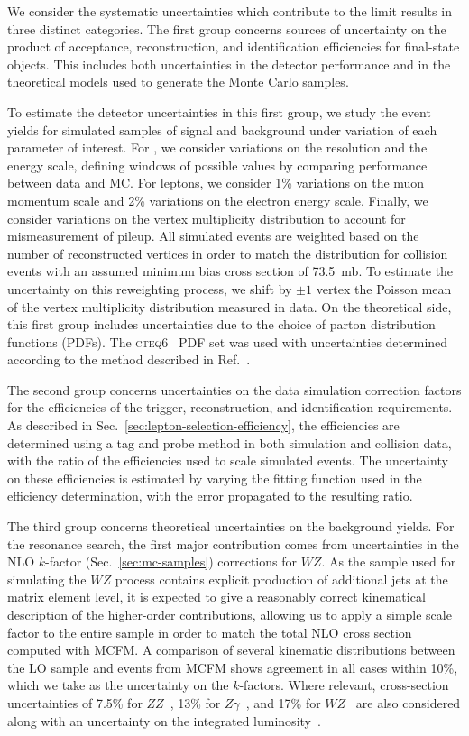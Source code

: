 We consider the systematic uncertainties which contribute to the limit results in three distinct categories.  The first group concerns sources of uncertainty on the product of acceptance, reconstruction, and identification efficiencies for final-state objects.  This includes both uncertainties in the detector performance and in the theoretical models used to generate the Monte Carlo samples.

To estimate the detector uncertainties in this first group, we study the event yields for simulated samples of signal and background under variation of each parameter of interest.  For \MET, we consider variations on the resolution and the energy scale, defining windows of possible values by comparing performance between data and MC.  For leptons, we consider 1\% variations on the muon momentum scale and 2\% variations on the electron energy scale.  Finally, we consider variations on the vertex multiplicity distribution to account for mismeasurement of pileup.  All simulated events are weighted based on the number of reconstructed vertices in order to match the distribution for collision events with an assumed minimum bias cross section of \SI{73.5}{mb}.  To estimate the uncertainty on this reweighting process, we shift by $\pm 1$ vertex the Poisson mean of the vertex multiplicity distribution measured in data.  On the theoretical side, this first group includes uncertainties due to the choice of parton distribution functions (PDFs).  The \textsc{cteq6}~\cite{Pumplin:2002vw} PDF set was used with uncertainties determined according to the method described in Ref.~\cite{Campbell:2006wx}.

The second group concerns uncertainties on the data \vs{} simulation correction factors for the efficiencies of the trigger, reconstruction, and identification requirements.  As described in Sec.~\ref{sec:lepton-selection-efficiency}, the efficiencies are determined using a tag and probe method in both simulation and collision data, with the ratio of the efficiencies used to scale simulated events.  The uncertainty on these efficiencies is estimated by varying the fitting function used in the efficiency determination, with the error propagated to the resulting ratio.

The third group concerns theoretical uncertainties on the background yields.  For the resonance search, the first major contribution comes from uncertainties in the NLO $k$-factor (Sec.~\ref{sec:mc-samples}) corrections for $WZ$.  As the \MADGRAPH{} sample used for simulating the $WZ$ process contains explicit production of additional jets at the matrix element level, it is expected to give a reasonably correct kinematical description of the higher-order contributions, allowing us to apply a simple scale factor to the entire sample in order to match the total NLO cross section computed with MCFM.  A comparison of several kinematic distributions between the LO \MADGRAPH sample and events from MCFM shows agreement in all cases within 10\%, which we take as the uncertainty on the $k$-factors.  Where relevant, cross-section uncertainties of 7.5\% for $ZZ$~\cite{Campbell:2011bn}, 13\% for $Z\gamma$~\cite{VGammaCMS}, and 17\% for $WZ$~\cite{CMS-PAS-EWK-11-010} are also considered along with an uncertainty on the integrated luminosity~\cite{LUMIPAS}.

